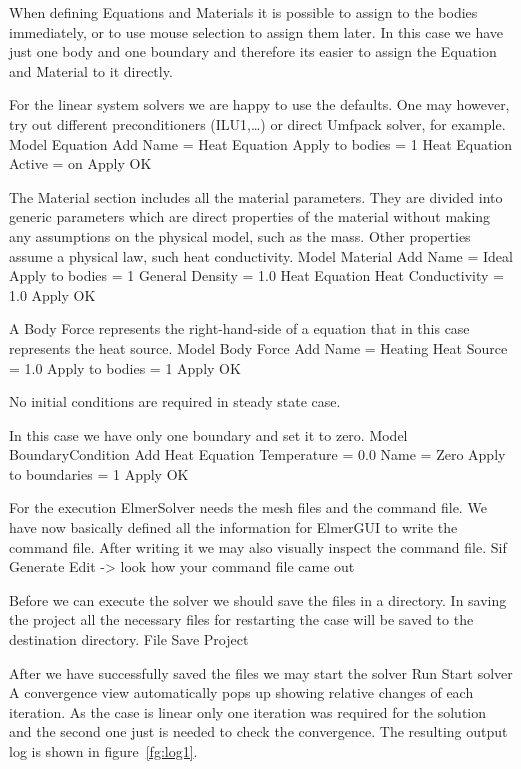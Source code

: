 When defining Equations and Materials it is possible to assign to the bodies immediately, or to use mouse
selection to assign them later. In this case we have just one body and one boundary and therefore its easier to assign 
the Equation and Material to it directly.

For the linear system solvers we are happy to use the defaults. One may however, try out different
preconditioners (ILU1,\ldots) or direct Umfpack solver, for example.
\ttbegin
Model
  Equation
    Add 
      Name = Heat Equation
      Apply to bodies = 1
      Heat Equation
        Active = on
  Apply   
  OK
\ttend        

The Material section includes all the material parameters.
They are divided into generic parameters which are direct properties of the material
without making any assumptions on the physical model, such as the mass. Other properties assume
a physical law, such heat conductivity.
\ttbegin
Model
  Material
    Add 
      Name = Ideal
      Apply to bodies = 1 
      General    
        Density = 1.0
      Heat Equation
        Heat Conductivity = 1.0
    Apply
    OK
\ttend

A Body Force represents the right-hand-side of a equation that in this case represents
the heat source. 
\ttbegin
Model
  Body Force
    Add 
      Name = Heating
      Heat Source = 1.0
      Apply to bodies = 1
    Apply
    OK
\ttend    

No initial conditions are required in steady state case.

In this case we have only one boundary and set it to zero.
\ttbegin
Model
  BoundaryCondition
    Add 
      Heat Equation
        Temperature = 0.0
      Name = Zero
      Apply to boundaries = 1
    Apply
    OK
\ttend   


For the execution 
ElmerSolver needs the mesh files and the command file. We have now basically defined
all the information for ElmerGUI to write the command file. After writing it we may also visually 
inspect the command file.
\ttbegin
Sif 
  Generate
  Edit -> look how your command file came out  
\ttend

Before we can execute the solver we should save the files in a directory. In saving the project all the
necessary files for restarting the case will be saved to the destination directory.
\ttbegin
File 
  Save Project
\ttend

After we have successfully saved the files we may start the solver
\ttbegin
Run
  Start solver
\ttend
A convergence view automatically pops up showing relative changes of each iteration.
As the case is linear only one iteration was required for the solution and the second one
just is needed to check the convergence. 
The resulting output log is shown in figure~\ref{fg:log1}.

